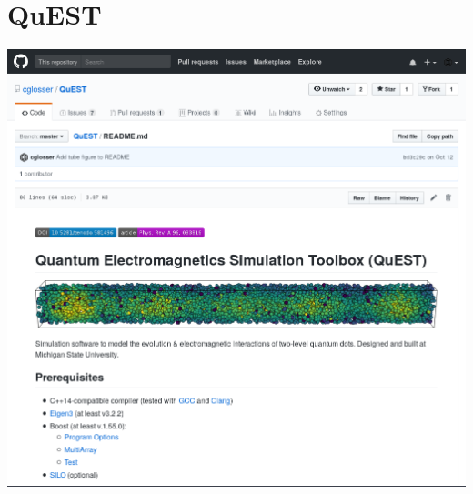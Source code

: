 \documentclass[aspectratio=169]{beamer}
\begin{document}
\section{QuEST}

\begin{frame}
  \centering
  \vspace{0.5cm}
  \includegraphics[height=\textheight]{figures/github.png}
\end{frame}
\end{document}
